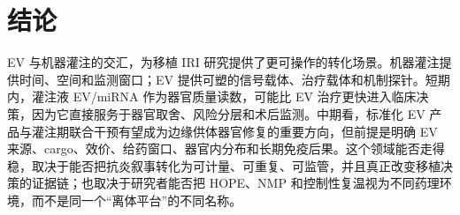 \documentclass[11pt,a4paper]{article}
\begin{document}
\section{结论}\label{ux7ed3ux8bba}

EV 与机器灌注的交汇，为移植 IRI
研究提供了更可操作的转化场景。机器灌注提供时间、空间和监测窗口；EV
提供可塑的信号载体、治疗载体和机制探针。短期内，灌注液 EV/miRNA
作为器官质量读数，可能比 EV 治疗更快进入临床决策，因为它直接服务于器官取舍、风险分层和术后监测。中期看，标准化 EV
产品与灌注期联合干预有望成为边缘供体器官修复的重要方向，但前提是明确 EV
来源、cargo、效价、给药窗口、器官内分布和长期免疫后果。这个领域能否走得稳，取决于能否把抗炎叙事转化为可计量、可重复、可监管，并且真正改变移植决策的证据链；也取决于研究者能否把 HOPE、NMP
和控制性复温视为不同药理环境，而不是同一个``离体平台''的不同名称。

\nocite{*}

\end{document}
